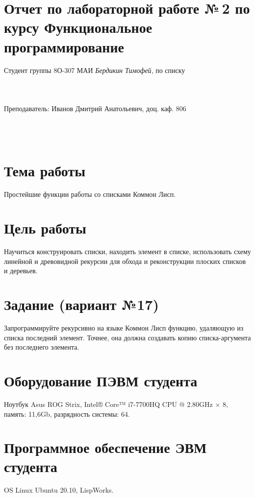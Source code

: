 \documentclass[12pt]{article}
\begin{document}
\section*{Отчет по лабораторной работе №\,2 
по курсу \guillemotleft  Функциональное программирование\guillemotright}
\begin{flushright}
Студент группы 8О-307 МАИ \textit{Бердикин Тимофей},  по списку \\
 \\
 \\
\ \\
Преподаватель: Иванов Дмитрий Анатольевич, доц. каф. 806 \\
 \\
 \\
 \\

\end{flushright}

\section{Тема работы}
Простейшие функции работы со списками Коммон Лисп.

\section{Цель работы}
Научиться конструировать списки, находить элемент в списке, использовать схему линейной и древовидной рекурсии для обхода и реконструкции плоских списков и деревьев.

\section{Задание (вариант №17)}
Запрограммируйте рекурсивно на языке Коммон Лисп функцию, удаляющую из списка последний элемент. Точнее, она должна создавать копию списка-аргумента без последнего элемента.

\section{Оборудование ПЭВМ студента}
Ноутбук Asus ROG Strix, Intel® Core™ i7-7700HQ CPU @ 2.80GHz × 8, память: 11,6Gb, разрядность системы: 64.

\section{Программное обеспечение ЭВМ студента}
OS Linux Ubuntu 20.10, LispWorks.
\end{document}
